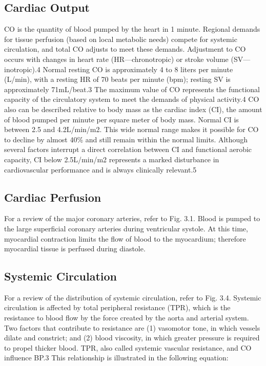 \subsection{Cardiac Output}
CO is the quantity of blood pumped by the heart in 1 minute. Regional demands for tissue perfusion (based on local metabolic needs) compete for systemic circulation, and total CO adjusts to meet these demands. Adjustment to CO occurs with changes in heart rate (HR—chronotropic) or stroke volume (SV—inotropic).4 Normal resting CO is approximately 4 to 8 liters per minute (L/min), with a resting HR of 70 beats per minute (bpm); resting SV is approximately 71mL/beat.3 The maximum value of CO represents the functional capacity of the circulatory system to meet the demands of physical activity.4
CO also can be described relative to body mass as the cardiac index (CI), the amount of blood pumped per minute per square meter of body mass. Normal CI is between 2.5 and 4.2L/min/m2. This wide normal range makes it possible for CO to decline by almost 40\% and still remain within the normal limits. Although several factors interrupt a direct correlation between CI and functional aerobic capacity,  CI below 2.5L/min/m2 represents a marked disturbance in cardiovascular performance and is always clinically relevant.5

\subsection{Cardiac Perfusion}

For a review of the major coronary arteries, refer to Fig. 3.1. Blood is pumped to the large superficial coronary arteries during ventricular systole. At this time, myocardial contraction limits the flow of blood to the myocardium; therefore myocardial tissue is perfused during diastole.

\subsection{Systemic Circulation}
For a review of the distribution of systemic circulation, refer to Fig. 3.4. Systemic circulation is affected by total peripheral resistance (TPR), which is the resistance to blood flow by the force created by the aorta and arterial system. Two factors that contribute to resistance are (1) vasomotor tone, in which vessels dilate and constrict; and (2) blood viscosity, in which greater pressure is required to propel thicker blood. TPR, also called systemic vascular resistance, and CO influence BP.3 This relationship is illustrated in the following equation:



